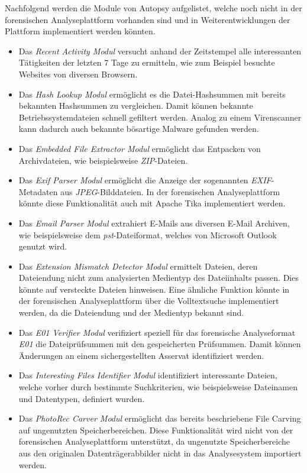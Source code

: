 \noindent
Nachfolgend werden die Module von Autopsy aufgelistet, welche noch nicht in der forensischen Analyseplattform vorhanden sind und in Weiterentwicklungen der Plattform implementiert werden könnten.
\begin{itemize}
\item Das \textit{Recent Activity Modul} versucht anhand der Zeitstempel alle interessanten Tätigkeiten der letzten 7 Tage zu ermitteln, wie zum Beispiel besuchte Websites von diversen Browsern.
\item Das \textit{Hash Lookup Modul} ermöglicht es die Datei-Hashsummen mit bereits bekannten Hashsummen zu vergleichen. Damit können bekannte Betriebssystemdateien schnell gefiltert werden. Analog zu einem Virenscanner kann dadurch auch bekannte bösartige Malware gefunden werden.
\item Das \textit{Embedded File Extractor Modul} ermöglicht das Entpacken von Archivdateien, wie beispielsweise \textit{ZIP}-Dateien.
\item Das \textit{Exif Parser Modul} ermöglicht die Anzeige der sogenannten \textit{EXIF}-Metadaten aus \textit{JPEG}-Bilddateien. In der forensischen Analyseplattform könnte diese Funktionalität auch mit Apache Tika implementiert werden.
\item Das \textit{Email Parser Modul} extrahiert E-Mails aus diversen E-Mail Archiven, wie beispielsweise dem \textit{\acrshort{pst}}-Dateiformat, welches von Microsoft Outlook genutzt wird.
\item Das \textit{Extension Mismatch Detector Modul} ermittelt Dateien, deren Dateiendung nicht zum analysierten Medientyp des Dateiinhalts passen. Dies könnte auf versteckte Dateien hinweisen. Eine ähnliche Funktion könnte in der forensischen Analyseplattform über die Volltextsuche implementiert werden, da die Dateiendung und der Medientyp bekannt sind.
\item Das \textit{E01 Verifier Modul} verifiziert speziell für das forensische Analyseformat \textit{E01} die Dateiprüfsummen mit den gespeicherten Prüfsummen. Damit können Änderungen an einem sichergestellten Asservat identifiziert werden.
\item Das \textit{Interesting Files Identifier Modul} identifiziert interessante Dateien, welche vorher durch bestimmte Suchkriterien, wie beispielsweise Dateinamen und Datentypen, definiert wurden.
\item Das \textit{PhotoRec Carver Modul} ermöglicht das bereits beschriebene File Carving auf ungenutzten Speicherbereichen. Diese Funktionalität wird nicht von der forensischen Analyseplattform unterstützt, da ungenutzte Speicherbereiche aus den originalen Datenträgerabbilder nicht in das Analysesystem importiert werden.

\end{itemize}
